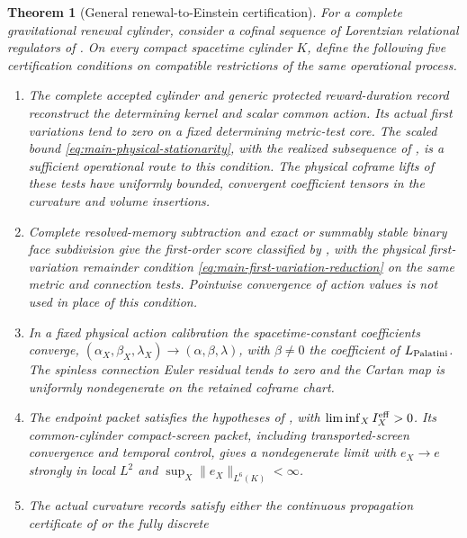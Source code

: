 \documentclass[11pt]{article}
\newtheorem{theorem}{Theorem}[section]
\numberwithin{equation}{section}
\theoremstyle{definition}
\theoremstyle{remark}
\begin{document}
\begin{theorem}[General renewal-to-Einstein certification]
\label{thm:main-renewal-einstein}
For a complete gravitational renewal cylinder, consider a cofinal
sequence of Lorentzian relational regulators of .  On every
compact spacetime cylinder $K$, define the following five certification
conditions on compatible restrictions of the same operational process.
\begin{enumerate}[label=\textup{(E\arabic*)},leftmargin=3em]
\item The complete accepted cylinder and generic protected reward-duration record
      reconstruct the determining kernel and scalar common action.  Its actual
      first variations tend to zero on a fixed determining metric-test core.
      The scaled bound \eqref{eq:main-physical-stationarity}, with the realized
      subsequence of , is a sufficient
      operational route to this condition.  The physical coframe lifts of these
      tests have uniformly bounded, convergent coefficient tensors in the
      curvature and volume insertions.
\item Complete resolved-memory subtraction and exact or summably stable binary
      face subdivision give the first-order score classified by       , with the physical
       first-variation remainder condition
       \eqref{eq:main-first-variation-reduction} on the same metric and
       connection tests. Pointwise convergence of action values is not used
       in place of this condition.
\item In a fixed physical action calibration the spacetime-constant
      coefficients converge,
      $(\alpha_X,\beta_X,\lambda_X)\to(\alpha,\beta,\lambda)$, with
      $\beta\ne0$ the coefficient of $L_{\rm Palatini}$.  The spinless
      connection Euler residual tends to zero and the Cartan map is uniformly
      nondegenerate on the retained coframe chart.
\item The endpoint packet satisfies the hypotheses of
      , with
      $\liminf_X I_X^{\rm eff}>0$.  Its common-cylinder compact-screen packet,
      including transported-screen convergence and temporal control, gives a
      nondegenerate limit with $e_X\to e$ strongly in local $L^2$ and
      $\sup_X\|e_X\|_{L^6(K)}<\infty$.
\item The actual curvature records satisfy either the continuous propagation
      certificate of  or the fully discrete

\end{enumerate}
\end{theorem}
\end{document}
